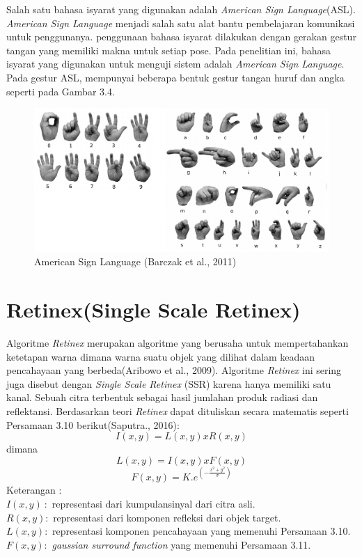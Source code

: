 Salah satu bahasa isyarat yang digunakan adalah \emph{American Sign Language}(ASL). \emph{American Sign Language} menjadi salah satu alat bantu pembelajaran komunikasi untuk penggunanya. penggunaan bahasa isyarat dilakukan dengan gerakan gestur tangan yang memiliki makna untuk setiap pose. Pada penelitian ini, bahasa isyarat yang digunakan untuk menguji sistem adalah \emph{American Sign Language}. Pada gestur ASL, mempunyai beberapa bentuk gestur tangan huruf dan angka seperti pada Gambar 3.4.
\begin{figure}[H]
	\centering
	\includegraphics[width=0.7\linewidth]{"asl"}
	\caption{American Sign Language (Barczak et al., 2011)}
	\label{fig:asl}
\end{figure}
\section{Retinex(Single Scale Retinex)}
Algoritme \emph{Retinex} merupakan algoritme yang berusaha untuk mempertahankan ketetapan warna dimana warna suatu objek yang dilihat dalam keadaan pencahayaan yang berbeda(Aribowo et al., 2009). Algoritme \emph{Retinex} ini sering juga disebut dengan \emph{Single Scale Retinex} (SSR) karena hanya memiliki satu kanal. Sebuah citra terbentuk sebagai hasil jumlahan produk radiasi dan reflektansi. Berdasarkan teori \emph{Retinex} dapat dituliskan secara matematis seperti Persamaan 3.10 berikut(Saputra., 2016):
\begin{equation}
	I(x,y) = L(x,y) x R(x,y)
\end{equation}
dimana 
\begin{equation}
	L(x,y) = I(x,y) x F(x,y)
\end{equation}
\begin{equation}
F(x,y) = K.e^{(-\frac{x^2 + y^2}{\sigma})}
\end{equation}
Keterangan :\\
\(I(x,y) \ :\) representasi dari kumpulansinyal dari citra asli.\\
\(R(x,y) :\) representasi dari komponen refleksi dari objek target.\\
\(L(x,y) :\) representasi komponen pencahayaan yang memenuhi Persamaan 3.10.\\
\(F(x,y) : \) \emph{gaussian surround function} yang memenuhi Persamaan 3.11.

